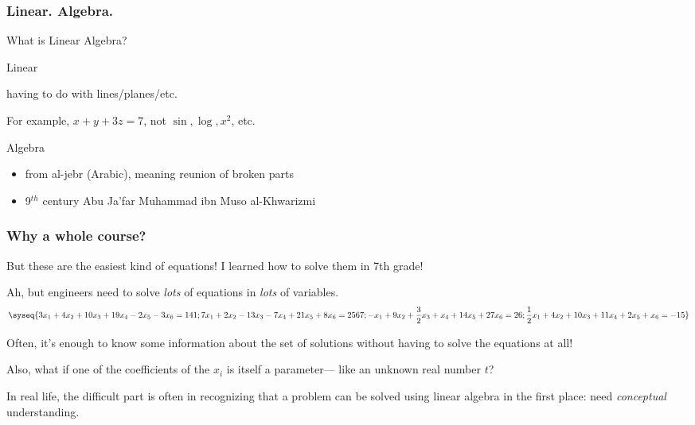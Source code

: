 

\begin{frame}
  \titlepage
\end{frame}



\begin{frame}
\frametitle{Linear.  Algebra.}
What is Linear Algebra?

\vfill

\alert{Linear}
\begin{itemize}
  \begin{webonly}
    \item having to do with lines/planes/etc. 
    \item For example, $x+y+3z=7$, not $\sin, \log, x^2$, etc.
  \end{webonly}
\end{itemize}

\vfill

\pause
\alert{Algebra}
\begin{itemize}
\pause
\item from al-jebr (Arabic), meaning reunion of broken parts
\item 9$^{th}$ century Abu Ja'far Muhammad ibn Muso al-Khwarizmi
\end{itemize}

\vfill

\end{frame}



\begin{frame}
  \frametitle{Why a whole course?}
  But these are the easiest kind of equations!  I learned how to solve them in
  7th grade!

  \bigskip
  \pause
  Ah, but engineers need to solve \emph{lots} of equations in \emph{lots} of
  variables.
  \[\syseq{
    3x_1 + 4x_2 + 10x_3 + 19x_4 - 2x_5 - 3x_6 = 141;
    7x_1 + 2x_2 - 13x_3 - 7x_4 + 21x_5 + 8x_6 = 2567;
    -x_1 + 9x_2 + \frac 32x_3 + x_4 + 14x_5 + 27x_6 = 26;
    \frac 12x_1 + 4x_2 + 10x_3 + 11x_4 + 2x_5 + x_6 = -15 
  }\]

  \bigskip
  \pause
  Often, it's enough to know some information about the set of solutions without
  having to solve the equations at all!

  \bigskip
  \pause
  Also, what if one of the coefficients of the $x_i$ is itself a parameter---
  like an unknown real number $t$?

  \bigskip
  \pause
  In real life, the difficult part is often in recognizing that a problem can be
  solved using linear algebra in the first place: need \emph{conceptual}
  understanding. 

\end{frame}



